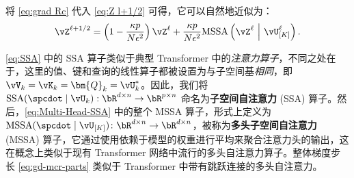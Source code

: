 \documentclass[../../book-main_zh.tex]{subfiles}
\begin{document}
将 \eqref{eq:grad Rc} 代入 \eqref{eq:Z l+1/2} 可得，它可以自然地近似为：
\begin{equation}
    \vZ^{\ell + 1/2} = \left(1 - \frac{\kappa p}{N\epsilon^2}\right)
    \vZ^{\ell} + \frac{\kappa p}{N\epsilon^2}
    \mathrm{MSSA}\left(\vZ^{\ell}\ \middle|\ \vU_{[K]}^{\ell}\right).
    \label{eq:gd-mcr-parts}
\end{equation}

\begin{remark}
    \eqref{eq:SSA} 中的 SSA 算子类似于典型 Transformer \citep{vaswani2017attention} 中的\textit{注意力算子}，不同之处在于，这里的值、键和查询的线性算子都被设置为与子空间基\textit{相同}，即 $\vV_{k} = \vK_{k} = \bm{Q}_{k} = \vU_k^*$。因此，我们将 $\mathrm{SSA}({\spcdot\mid\vU_k}): \bR^{d\times n} \rightarrow \bR^{p\times n}$ 命名为\textbf{子空间自注意力} (SSA) 算子。然后，\eqref{eq:Multi-Head-SSA} 中的整个 MSSA 算子，形式上定义为 \(\mathrm{MSSA}({\spcdot \mid \vU_{[K]}}) \colon \bR^{d \times n} \to \bR^{d \times n}\)，被称为\textbf{多头子空间自注意力} (MSSA) 算子，它通过使用依赖于模型的权重进行平均来聚合注意力头的输出，这在概念上类似于现有 Transformer 网络中流行的多头自注意力算子。整体梯度步长 \eqref{eq:gd-mcr-parts} 类似于 Transformer 中带有跳跃连接的多头自注意力。
\end{remark}
\end{document}
